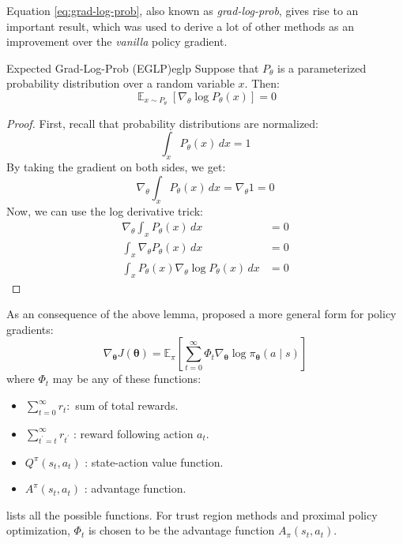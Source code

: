 Equation \ref{eq:grad-log-prob}, also known as \textit{grad-log-prob}, gives rise to an important result, which was used to derive a lot of other methods as an improvement over the \textit{vanilla} policy gradient.
\begin{lemma}{Expected Grad-Log-Prob (EGLP)}{eglp}
    Suppose that $P_\theta$ is a parameterized probability distribution over a random variable $x$. Then:
    \begin{equation}
        \mathop{\mathbb{E}}_{x \sim P_\theta}\left[\nabla_\theta \log{P_\theta(x)}\right] = 0
    \end{equation}
\end{lemma}
\begin{proof}
    First, recall that probability distributions are normalized:
    \begin{equation}
        \int_x P_\theta(x) \,dx = 1
    \end{equation}
    By taking the gradient on both sides, we get:
    \begin{equation}
        \nabla_\theta\int_x P_\theta(x) \,dx = \nabla_\theta 1 = 0
    \end{equation}
    Now, we can use the log derivative trick:
    \begin{align}
        \nabla_\theta\int_x P_\theta(x) \,dx &= 0 \nonumber\\
        \int_x \nabla_\theta P_\theta(x) \,dx &= 0 \\
        \int_x P_\theta(x) \nabla_\theta\log{P_\theta(x)} \,dx &= 0 \nonumber
    \end{align}
\end{proof}

As an consequence of the above lemma, \cite{https://doi.org/10.48550/arxiv.1506.02438} proposed a more general form for policy gradients:
\begin{equation}
    \nabla_{\boldsymbol\theta} J(\boldsymbol\theta) = \mathbb{E}_\pi\left[\sum_{t=0}^\infty\Phi_t\nabla_{\boldsymbol\theta}\log{\pi_{\boldsymbol\theta}(a \mid s)}\right]
\end{equation}
where $\Phi_t$ may be any of these functions:
\begin{itemize}
    \item $\sum_{t=0}^{\infty} r_t:$ sum of total rewards.
    \item $\sum_{t^{\prime}=t}^{\infty} r_{t^{\prime}}$ : reward following action $a_t$.
    \item $Q^\pi\left(s_t, a_t\right)$ : state-action value function.
    \item $A^\pi\left(s_t, a_t\right)$ : advantage function.
\end{itemize}
\cite{https://doi.org/10.48550/arxiv.1506.02438} lists all the possible functions. For trust region methods and proximal policy optimization, $\Phi_t$ is chosen to be the advantage function $A_\pi\left(s_t, a_t\right)$.

